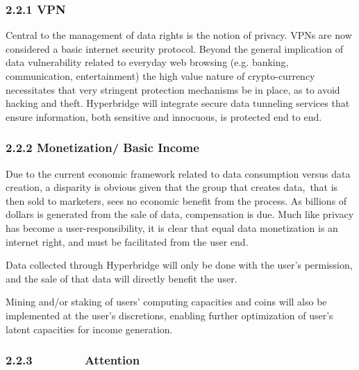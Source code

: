 \documentclass[]{article}
\begin{document}
{}

\hypertarget{h.tlnerex8fnuq}{%
\subsubsection{\texorpdfstring{{2.2.1
VPN}}{2.2.1 VPN}}\label{h.tlnerex8fnuq}}

{Central to the management of data rights is the notion of privacy. VPNs
are now considered a basic internet security protocol. Beyond the
general implication of data vulnerability related to everyday web
browsing (e.g. banking, communication, entertainment) the high value
nature of crypto-currency necessitates that very stringent protection
mechanisms be in place, as to avoid hacking and theft. Hyperbridge will
integrate secure data tunneling services that ensure information, both
sensitive and innocuous, is protected end to end. ~ }

{}

\hypertarget{h.wqrovzr5bezd}{%
\subsubsection{\texorpdfstring{{2.2.2 Monetization/ Basic Income
}}{2.2.2 Monetization/ Basic Income }}\label{h.wqrovzr5bezd}}

{Due to the current economic framework related to data consumption
versus data creation, a disparity is obvious given that the group that
creates data}{,}{~that is then sold to marketers, sees no economic
benefit from the process. As billions of dollars is generated from the
sale of data, compensation is due. Much like privacy has become a
user-responsibility, it is clear that equal data monetization is an
internet right, and must be facilitated from the user end. }

{}

{Data collected through Hyperbridge will only be done with the user's
permission, and the sale of that data will directly benefit the user. }

{}

{Mining and/or staking of users' computing capacities and coins will
also be implemented at the user's discretions, enabling further
optimization of user's latent capacities for income generation. }

\hypertarget{h.nds6n37tv79g}{%
\subsubsection{\texorpdfstring{{2.2.3~~~~~~~~Attention~~~~~~~~}}{2.2.3~~~~~~~~Attention~~~~~~~~}}\label{h.nds6n37tv79g}}
\end{document}
